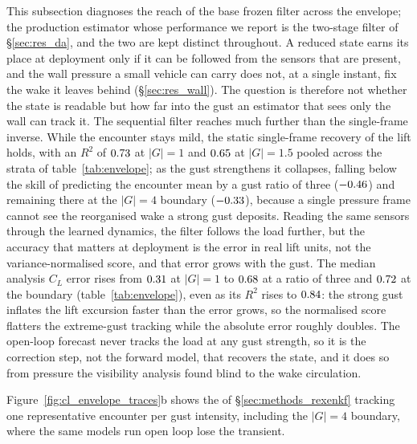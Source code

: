 This subsection diagnoses the reach of the base frozen filter across the envelope; the production estimator whose performance we report is the two-stage filter of \S\ref{sec:res_da}, and the two are kept distinct throughout. A reduced state earns its place at deployment only if it can be followed from the sensors that are present, and the wall pressure a small vehicle can carry does not, at a single instant, fix the wake it leaves behind (\S\ref{sec:res_wall}). The question is therefore not whether the state is readable but how far into the gust an estimator that sees only the wall can track it. The sequential filter reaches much further than the single-frame inverse. While the encounter stays mild, the static single-frame recovery of the lift holds, with an $R^2$ of $0.73$ at $|G| = 1$ and $0.65$ at $|G| = 1.5$ pooled across the strata of table~\ref{tab:envelope}; as the gust strengthens it collapses, falling below the skill of predicting the encounter mean by a gust ratio of three ($-0.46$) and remaining there at the $|G| = 4$ boundary ($-0.33$), because a single pressure frame cannot see the reorganised wake a strong gust deposits. Reading the same sensors through the learned dynamics, the filter follows the load further, but the accuracy that matters at deployment is the error in real lift units, not the variance-normalised score, and that error grows with the gust. The median analysis $C_L$ error rises from $0.31$ at $|G| = 1$ to $0.68$ at a ratio of three and $0.72$ at the boundary (table~\ref{tab:envelope}), even as its $R^2$ rises to $0.84$: the strong gust inflates the lift excursion faster than the error grows, so the normalised score flatters the extreme-gust tracking while the absolute error roughly doubles. The open-loop forecast never tracks the load at any gust strength, so it is the correction step, not the forward model, that recovers the state, and it does so from pressure the visibility analysis found blind to the wake circulation.\re



Figure~\ref{fig:cl_envelope_traces}b shows the \TwoStageKF{} of \S\ref{sec:methods_rexenkf} tracking one representative encounter per gust intensity, including the $|G| = 4$ boundary, where the same models run open loop lose the transient.\re

